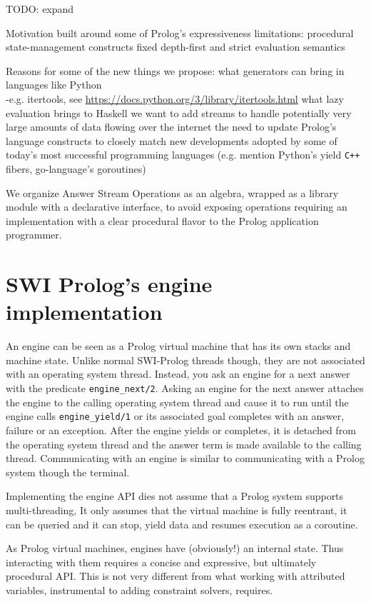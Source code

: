 \documentclass{new_tlp}
\begin{document}
{\Large TODO: expand}

Motivation built around some of Prolog's expressiveness limitations:
\BI
\I procedural state-management constructs
\I fixed depth-first and strict evaluation semantics
\EI

Reasons for some of the new things we propose:
\BI
\I what generators can bring in languages like Python \\-e.g. itertools, 
see \url{https://docs.python.org/3/library/itertools.html}
\I what lazy evaluation brings to Haskell
\I we want to add streams to
handle potentially very large amounts of data flowing over the internet
\I the need to update Prolog's language constructs to closely match new developments adopted by some of today's most successful programming languages (e.g. mention Python's yield \verb~C++~ fibers, go-language's goroutines)
\EI

We organize Answer Stream Operations as an algebra, wrapped as a library module with a declarative interface, to avoid exposing  operations requiring an implementation with a clear procedural flavor to the Prolog application programmer.

\section{SWI Prolog's engine implementation}

An engine can be seen as a Prolog virtual machine that has its own stacks and machine state. Unlike normal SWI-Prolog threads \cite{swi,swi_threads} though, they are not associated with an operating system thread. Instead, you ask an engine for a next answer with the predicate {\tt engine\_next/2}. Asking an engine for the next answer attaches the engine to the calling operating system thread and cause it to run until the engine calls {\tt engine\_yield/1} or its associated goal completes with an answer, failure or an exception. After the engine yields or completes, it is detached from the operating system thread and the answer term is made available to the calling thread. Communicating with an engine is similar to communicating with a Prolog system though the terminal.

Implementing the engine API dies not assume that a Prolog system supports multi-threading, It only assumes that the virtual machine is fully reentrant, it can be queried and it can stop, yield data and resumes execution as a coroutine.

As Prolog virtual machines, engines have (obviously!) an internal state. Thus interacting with them requires a concise and expressive, but ultimately procedural API. This is not very different from what working with attributed variables, instrumental to adding constraint solvers, requires.
\end{document}
